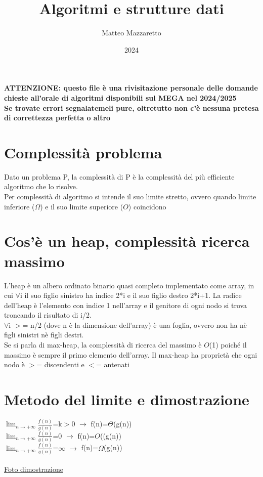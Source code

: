 \documentclass[12pt,oneside,a4paper]{article}
\title{Algoritmi e strutture dati}
\author{Matteo Mazzaretto}
\date{2024}
\newcommand\Omicron{O}
\begin{document}
\maketitle
\begin{center}
	\textbf{ATTENZIONE: questo file è una rivisitazione personale delle domande chieste all'orale di algoritmi disponibili sul MEGA nel 2024/2025\\
	Se trovate errori segnalatemeli pure, oltretutto non c'è nessuna pretesa di correttezza perfetta o altro}
\end{center}
\newpage
\begin{center}
\renewcommand{\contentsname}{Indice}
\tableofcontents
\end{center}
\newpage
\setcounter{page}{1}
\section{Complessità problema}
Dato un problema P, la complessità di P è la complessità del più efficiente algoritmo che lo risolve.\\
Per complessità di algoritmo si intende il suo limite stretto, ovvero quando limite inferiore ($\Omega$) e il suo limite superiore ($\Omicron$) coincidono
\section{Cos'è un heap, complessità ricerca massimo}
L'heap è un albero ordinato binario quasi completo implementato come array, in cui $\forall$i il suo figlio sinistro ha indice 2*i e il suo figlio destro 2*i+1. La radice dell'heap è l'elemento con indice 1 nell'array e il genitore di ogni nodo si trova troncando il risultato di i/2.\\
$\forall$i $>$= n/2 (dove n è la dimensione dell'array) è una foglia, ovvero non ha nè figli sinistri nè figli destri.\\
Se si parla di max-heap, la complessità di ricerca del massimo è  $\Omicron$(1) poiché il massimo è sempre il primo elemento dell'array. Il max-heap ha proprietà che ogni nodo è $>$= discendenti e $<$= antenati
\section{Metodo del limite e dimostrazione}
$\lim_{n\to +\infty}$$\frac{f(n)}{g(n)}$=k$>$0 $\to$ f(n)=$\Theta$(g(n))
\\
$\lim_{n\to +\infty}$$\frac{f(n)}{g(n)}$=0 $\to$ f(n)=$\Omicron$((g(n))
\\
$\lim_{n\to +\infty}$$\frac{f(n)}{g(n)}$=$\infty$ $\to$ f(n)=$\Omega$(g(n))
\\\\
\href{limite.pdf}{Foto dimostrazione}
\end{document}
